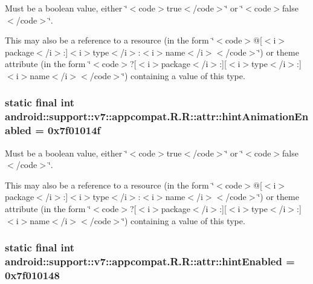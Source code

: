 Must be a boolean value, either \char`\"{}$<$code$>$true$<$/code$>$\char`\"{} or \char`\"{}$<$code$>$false$<$/code$>$\char`\"{}. 

This may also be a reference to a resource (in the form \char`\"{}$<$code$>$@\mbox{[}$<$i$>$package$<$/i$>$:\mbox{]}$<$i$>$type$<$/i$>$:$<$i$>$name$<$/i$>$$<$/code$>$\char`\"{}) or theme attribute (in the form \char`\"{}$<$code$>$?\mbox{[}$<$i$>$package$<$/i$>$:\mbox{]}\mbox{[}$<$i$>$type$<$/i$>$:\mbox{]}$<$i$>$name$<$/i$>$$<$/code$>$\char`\"{}) containing a value of this type. \hypertarget{classandroid_1_1support_1_1v7_1_1appcompat_1_1_r_1_1attr_648c4d0450fae188ff69716c76467a43}{
\subsubsection[{hintAnimationEnabled}]{\setlength{\rightskip}{0pt plus 5cm}static final int android::support::v7::appcompat.R.R::attr::hintAnimationEnabled = 0x7f01014f}}
\label{classandroid_1_1support_1_1v7_1_1appcompat_1_1_r_1_1attr_648c4d0450fae188ff69716c76467a43}


Must be a boolean value, either \char`\"{}$<$code$>$true$<$/code$>$\char`\"{} or \char`\"{}$<$code$>$false$<$/code$>$\char`\"{}. 

This may also be a reference to a resource (in the form \char`\"{}$<$code$>$@\mbox{[}$<$i$>$package$<$/i$>$:\mbox{]}$<$i$>$type$<$/i$>$:$<$i$>$name$<$/i$>$$<$/code$>$\char`\"{}) or theme attribute (in the form \char`\"{}$<$code$>$?\mbox{[}$<$i$>$package$<$/i$>$:\mbox{]}\mbox{[}$<$i$>$type$<$/i$>$:\mbox{]}$<$i$>$name$<$/i$>$$<$/code$>$\char`\"{}) containing a value of this type. \hypertarget{classandroid_1_1support_1_1v7_1_1appcompat_1_1_r_1_1attr_289b89602da9832c08bed9b84494964e}{
\subsubsection[{hintEnabled}]{\setlength{\rightskip}{0pt plus 5cm}static final int android::support::v7::appcompat.R.R::attr::hintEnabled = 0x7f010148}}
\label{classandroid_1_1support_1_1v7_1_1appcompat_1_1_r_1_1attr_289b89602da9832c08bed9b84494964e}


